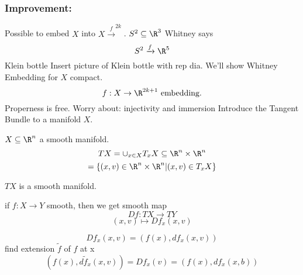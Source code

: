 \subsubsection*{Improvement:}
Possible to embed $X$ into $X \xrightarrow{f}^{2k}$.
\newline $S^2 \subseteq \R^3$ Whitney says
  $$S^2 \xrightarrow{f}\R^5$$
Klein bottle
  \newline Insert picture of Klein bottle with rep dia.
  \newline We'll show Whitney Embedding for $X$ compact.
    $$f: X \to \R^{2k+1} \text{ embedding.}$$
  Properness is free.
  \newline Worry about: injectivity and immersion
  \newline Introduce the Tangent Bundle to a manifold $X$.
\begin{definition}
  $X \subseteq \R^n $ a smooth manifold.
    $$TX = \cup_{x\in X}T_xX \subseteq \R^n \times \R^n$$
    $$ = \{ (x,v) \in \R^n \times \R^n | (x,v)\in T_xX\} $$
\end{definition}
$TX$ is a smooth manifold.
\begin{definition}
  if $f: X \to Y$ smooth, then we get smooth map
    $$Df: TX \to TY$$
    $$ (x,v) \mapsto Df_x(x,v)$$
\end{definition}
\begin{notation}
  $$Df_x(x,v) = \left(f(x), df_x(x,v) \right)$$
  find extension $\tilde{f}$ of $f$ at x
    $$\left(f(x),d\tilde{f}_x(x,v)\right)= Df_x(v)= \left(f(x), df_x(x,b)\right)$$
\end{notation}
